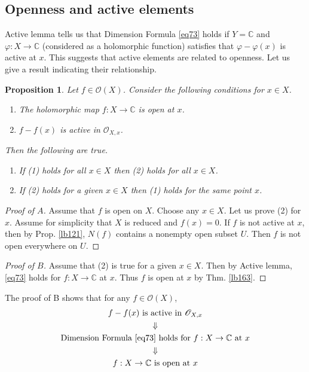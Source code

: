 \documentclass[12pt,b5paper,notitlepage]{report}
\theoremstyle{definition}
\theoremstyle{plain}
\newtheorem{pp}[df]{Proposition}
\newcommand{\scr}{\mathscr}
\newcommand{\Cbb}{\mathbb C}
\numberwithin{equation}{section}
\begin{document}
\subsection{Openness and active elements}



Active lemma tells us that Dimension Formula \eqref{eq73} holds if $Y=\Cbb$ and $\varphi:X\rightarrow\Cbb$ (considered as a holomorphic function) satisfies that $\varphi-\varphi(x)$ is active at $x$. This suggests that active elements are related to openness. Let us give a result indicating their relationship.

\begin{pp}\label{lb165}
Let $f\in\scr O(X)$. Consider the following conditions for $x\in X$.
\begin{enumerate}[label=(\arabic*)]
\item The holomorphic map $f:X\rightarrow\Cbb$ is open at $x$.
\item $f-f(x)$ is active in $\scr O_{X,x}$.  
\end{enumerate}
Then the following are true.
\begin{enumerate}[label=\boxed{\Alph*}]
\item If (1) holds for all $x\in X$ then (2) holds for all $x\in X$.
\item If (2) holds for a given $x\in X$ then (1) holds for the same point $x$.
\end{enumerate}
\end{pp}



\begin{proof}[Proof of $\boxed{A}$]
Assume that $f$ is open on $X$. Choose any $x\in X$. Let us prove (2) for $x$. Assume for simplicity that $X$ is reduced and $f(x)=0$. If $f$ is not active at $x$, then by Prop. \ref{lb121}, $N(f)$ contains a nonempty open subset $U$. Then $f$ is not open everywhere on $U$.
\end{proof}




\begin{proof}[Proof of $\boxed{B}$]
Assume that (2) is true for a given $x\in X$. Then by Active lemma, \eqref{eq73} holds for $f:X\rightarrow \Cbb$ at $x$. Thus $f$ is open at $x$ by Thm. \ref{lb163}.
\end{proof}



The proof of B shows that for any $f\in\scr O(X)$,
\begin{gather}\label{eq75}
\begin{gathered}
f-f(x)\text{ is active in }\scr O_{X,x}\\
\Downarrow\\
\text{Dimension Formula \eqref{eq73} holds for $f:X\rightarrow \Cbb$ at }x\\
\Downarrow\\
f:X\rightarrow\Cbb\text{ is open at }x
\end{gathered}
\end{gather}
\end{document}
